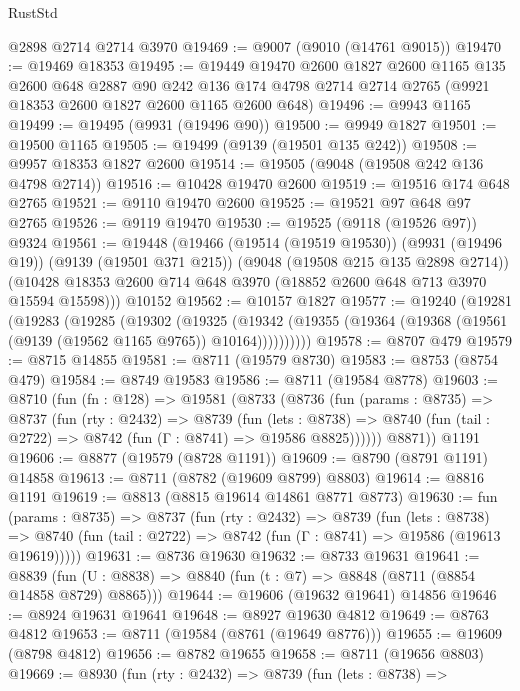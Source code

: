 \begin{lexlean}{RustStd}
\begin{coremodule}
    @2898
    @2714
    @2714
    @3970
@19469 := @9007 (@9010 (@14761 @9015))
@19470 := @19469 @18353
@19495 := @19449
    @19470
    @2600
    @1827
    @2600
    @1165
    @135
    @2600
    @648
    @2887
    @90
    @242
    @136
    @174
    @4798
    @2714
    @2714
    @2765
    (@9921 @18353 @2600 @1827 @2600 @1165 @2600 @648)
@19496 := @9943 @1165
@19499 := @19495 (@9931 (@19496 @90))
@19500 := @9949 @1827
@19501 := @19500 @1165
@19505 := @19499 (@9139 (@19501 @135 @242))
@19508 := @9957 @18353 @1827 @2600
@19514 := @19505 (@9048 (@19508 @242 @136 @4798 @2714))
@19516 := @10428 @19470 @2600
@19519 := @19516 @174 @648 @2765
@19521 := @9110 @19470 @2600
@19525 := @19521 @97 @648 @97 @2765
@19526 := @9119 @19470
@19530 := @19525 (@9118 (@19526 @97)) @9324
@19561 := @19448
    (@19466
      (@19514 (@19519 @19530))
      (@9931 (@19496 @19))
      (@9139 (@19501 @371 @215))
      (@9048 (@19508 @215 @135 @2898 @2714))
      (@10428 @18353 @2600 @714 @648 @3970 (@18852 @2600 @648 @713 @3970 @15594 @15598)))
    @10152
@19562 := @10157 @1827
@19577 := @19240
    (@19281
      (@19283
        (@19285
          (@19302
            (@19325
              (@19342 (@19355 (@19364 (@19368 (@19561 (@9139 (@19562 @1165 @9765)) @10164))))))))))
@19578 := @8707 @479
@19579 := @8715 @14855
@19581 := @8711 (@19579 @8730)
@19583 := @8753 (@8754 @479)
@19584 := @8749 @19583
@19586 := @8711 (@19584 @8778)
@19603 := @8710
    (fun (fn : @128) =>
    @19581
      (@8733
        (@8736
          (fun (params : @8735) =>
          @8737
            (fun (rty : @2432) =>
            @8739
              (fun (lets : @8738) =>
              @8740 (fun (tail : @2722) => @8742 (fun (Γ : @8741) => @19586 @8825))))))
        @8871))
    @1191
@19606 := @8877 (@19579 (@8728 @1191))
@19609 := @8790 (@8791 @1191) @14858
@19613 := @8711 (@8782 (@19609 @8799) @8803)
@19614 := @8816 @1191
@19619 := @8813 (@8815 @19614 @14861 @8771 @8773)
@19630 := fun (params : @8735) =>
  @8737
    (fun (rty : @2432) =>
    @8739
      (fun (lets : @8738) =>
      @8740 (fun (tail : @2722) => @8742 (fun (Γ : @8741) => @19586 (@19613 @19619)))))
@19631 := @8736 @19630
@19632 := @8733 @19631
@19641 := @8839
    (fun (U : @8838) => @8840 (fun (t : @7) => @8848 (@8711 (@8854 @14858 @8729) @8865)))
@19644 := @19606 (@19632 @19641) @14856
@19646 := @8924 @19631 @19641
@19648 := @8927 @19630 @4812
@19649 := @8763 @4812
@19653 := @8711 (@19584 (@8761 (@19649 @8776)))
@19655 := @19609 (@8798 @4812)
@19656 := @8782 @19655
@19658 := @8711 (@19656 @8803)
@19669 := @8930
    (fun (rty : @2432) =>
    @8739
      (fun (lets : @8738) =>

\end{coremodule}
\end{lexlean}
